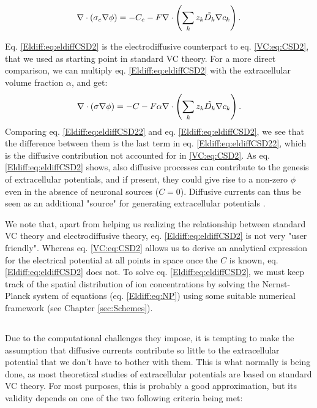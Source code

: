 \begin{equation}
\nabla \cdot (\sigma_e\nabla\phi) = - C_e - F \nabla \cdot \left (\sum_k{z_k \tilde{D_k}{\bf \nabla} c_{k}} \right).
\label{Eldiff:eq:eldiffCSD2}
\end{equation}

Eq. \ref{Eldiff:eq:eldiffCSD2} is the electrodiffusive counterpart to eq. \ref{VC:eq:CSD2}, that we used as starting point in standard VC theory. For a more direct comparison, we can multiply eq.  \ref{Eldiff:eq:eldiffCSD2} with the extracellular volume fraction $\alpha$, and get:
\begin{equation}
\nabla \cdot (\sigma\nabla\phi) = - C - F\alpha \nabla \cdot \left (\sum_k{z_k \tilde{D_k}{\bf \nabla} c_{k}} \right).
\label{Eldiff:eq:eldiffCSD22}
\end{equation}
Comparing eq. \ref{Eldiff:eq:eldiffCSD22} and eq.  \ref{Eldiff:eq:eldiffCSD2}, we see that the difference between them is the last term in eq. \ref{Eldiff:eq:eldiffCSD22}, which is the diffusive contribution not accounted for in \ref{VC:eq:CSD2}. As eq. \ref{Eldiff:eq:eldiffCSD2} shows, also diffusive processes can contribute to the genesis of extracellular potentials, and if present, they could give rise to a non-zero $\phi$ even in the absence of neuronal sources ($C = 0$). Diffusive currents can thus be seen as an additional "source" for generating extracellular potentials \citep{Halnes2017}. 

We note that, apart from helping us realizing the relationship between standard VC theory and electrodiffusive theory, eq. \ref{Eldiff:eq:eldiffCSD2} is not very "user friendly". Whereas eq. \ref{VC:eq:CSD2} allows us to derive an analytical expression for the electrical potential at all points in space once the $C$ is known, eq. \ref{Eldiff:eq:eldiffCSD2} does not. To solve  eq. \ref{Eldiff:eq:eldiffCSD2}, we must keep track of the spatial distribution of ion concentrations by solving the Nernst-Planck system of equations (eq. \ref{Eldiff:eq:NP}) using some suitable numerical framework (see Chapter \ref{sec:Schemes}). 


\subsection{}
\label{sec:Eldiff:estimates}
Due to the computational challenges they impose, it is tempting to make the assumption that diffusive currents contribute so little to the extracellular potential that we don't have to bother with them. This is what normally is being done, as most theoretical studies of extracellular potentials are based on standard VC theory. For most purposes, this is probably a good approximation, but its validity depends on one of the two following criteria being met:

